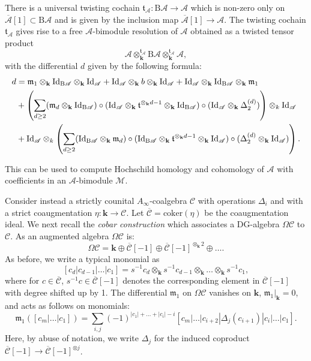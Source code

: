 \documentclass{gtpart}
\renewcommand{\k}{\mathbf{k}}
\newcommand{\m}{\mathfrak{m}}
\renewcommand{\t}{\mathfrak{t}}
\newcommand{\A}{\mathscr{A}}
\newcommand{\Abar}{\overline{\mathscr{A}}}
\newcommand{\Cbar}{\overline{\mathscr{C}}}
\renewcommand{\Bar}{\mathrm{B}}
\renewcommand{\C}{\mathscr{C}}
\begin{document}
There is a universal twisting cochain $\t_\A \colon \Bar \A \to \A$ which is non-zero only on
$\Abar[1] \subset \Bar \A$ and is given by the inclusion map $\Abar[1] \to \A$. The twisting cochain $\t_\A$ gives rise to a free $\A$-bimodule resolution of $\A$ obtained as a
twisted tensor product
\[ \A \otimes_{\k}^{\t_\A} \Bar \A \otimes_{\k}^{\t_\A} \A, \]
with the differential $d$ given by the following formula:
\begin{align} \label{bimodulediff} 
	d&=\m_1 \otimes_\k \mathrm{Id}_{\Bar \A} \otimes_\k \mathrm{Id}_{\A}  + \mathrm{Id}_{\A}
    \otimes_\k b \otimes_\k \mathrm{Id}_\A +  \mathrm{Id}_\A \otimes_\k \mathrm{Id}_{\Bar \A}
    \otimes_\k \m_1 \\\notag
    &+ \left(\sum_{d \geq 2 }
(\m_d \otimes_{\k} \mathrm{Id}_{\Bar \A}) \circ (\mathrm{Id}_\A \otimes_\k \t^{\otimes_\k {d-1}} \otimes_\k \mathrm{Id}_{\Bar
\A})  \circ
(\mathrm{Id}_{\A} \otimes_\k
    \Delta_2^{(d)}) \right) \otimes_{k} \mathrm{Id}_\A \\\notag 
    &+ \mathrm{Id}_\A \otimes_k \left(\sum_{d \geq 2 }
    (\mathrm{Id}_{\Bar \A} \otimes_\k \m_d) \circ (\mathrm{Id}_{\Bar \A} \otimes_\k \t^{\otimes_\k {d-1}} \otimes_\k \mathrm{Id}_{\A})  \circ
    (\Delta_2^{(d)} \otimes_\k \mathrm{Id}_{\A} ) \right).
\end{align}

This can be used to compute Hochschild homology and cohomology of $\A$ with coefficients in
an $\A$-bimodule $\mathscr{M}$. 

Consider instead a strictly counital $A_\infty$-coalgebra $\C$ with operations $\Delta_i$ and
with a strict coaugmentation $\eta\colon \k \to \C$. Let $\Cbar = \mathrm{coker}(\eta)$ be the coaugmentation ideal. We next recall the \emph{cobar construction} which associates a DG-algebra $\Omega \C$ to $\C$.  As an augmented algebra $\Omega \C$ is:
    \[ \Omega \C = \k \oplus \Cbar [-1] \oplus \Cbar [-1]^{\otimes_\k 2} \oplus \ldots .\]
As before, we write a typical monomial as \[ [c_d|c_{d-1}|\ldots |c_1] = s^{-1} c_d \otimes_\k
s^{-1} c_{d-1} \otimes_\k \ldots
\otimes_\k s^{-1} c_1, \]
where for $c \in \Cbar$, $s^{-1} c \in \Cbar[-1]$ denotes the corresponding element in $\Cbar[-1]$ with degree shifted up by 1. The differential $\m_{1}$ on $\Omega \C$ vanishes on $\k$, $\m_{1}|_{\k}=0$, and acts as follows on monomials:
\[ \m_1 ([c_m|\ldots |c_1]) = \sum_{i,j} (-1)^{|c_{1}|+\ldots+|c_i|-i}
    [c_m|\ldots|c_{i+2}|\Delta_j(c_{i+1})|c_{i}|\ldots |c_1]. \]
Here, by abuse of notation, we write $\Delta_j$ for the induced coproduct $\Cbar[-1] \to \Cbar[-1]^{\otimes j}$.
\end{document}
